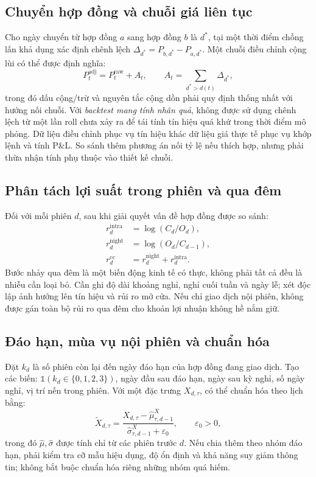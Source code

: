 \documentclass[12pt,a4paper,oneside]{article}
\newcommand{\Ind}{\mathbb{1}}
\begin{document}
\subsection{Chuyển hợp đồng và chuỗi giá liên tục}
Cho ngày chuyển từ hợp đồng $a$ sang hợp đồng $b$ là $d^*$, tại một thời điểm chồng lấn khả dụng xác định chênh lệch $\Delta_{d^*}=P_{b,d^*}-P_{a,d^*}$. Một chuỗi điều chỉnh cộng lùi có thể được định nghĩa:
\begin{equation}
P_t^{\mathrm{adj}}=P_t^{\mathrm{raw}}+A_t,\qquad
A_t=\sum_{d^*>d(t)}\Delta_{d^*},
\end{equation}
trong đó dấu cộng/trừ và nguyên tắc cộng dồn phải quy định thống nhất với hướng nối chuỗi. Với \emph{backtest mang tính nhân quả}, không được sử dụng chênh lệch từ một lần roll chưa xảy ra để tái tính tín hiệu quá khứ trong thời điểm mô phỏng. Dữ liệu điều chỉnh phục vụ tín hiệu khác dữ liệu giá thực tế phục vụ khớp lệnh và tính P\&L. So sánh thêm phương án nối tỷ lệ nếu thích hợp, nhưng phải thừa nhận tính phụ thuộc vào thiết kế chuỗi.

\subsection{Phân tách lợi suất trong phiên và qua đêm}
Đối với mỗi phiên $d$, sau khi giải quyết vấn đề hợp đồng được so sánh:
\begin{align}
r_d^{\mathrm{intra}}&=\log(C_d/O_d),\\
r_d^{\mathrm{night}}&=\log(O_d/C_{d-1}),\\
r_d^{\mathrm{cc}}&=r_d^{\mathrm{night}}+r_d^{\mathrm{intra}}.
\end{align}
Bước nhảy qua đêm là một biến động kinh tế có thực, không phải tất cả đều là nhiễu cần loại bỏ. Cần ghi độ dài khoảng nghỉ, nghỉ cuối tuần và ngày lễ; xét độc lập ảnh hưởng lên tín hiệu và rủi ro mở cửa. Nếu chỉ giao dịch nội phiên, không được gán toàn bộ rủi ro qua đêm cho khoản lợi nhuận không hề nắm giữ.

\subsection{Đáo hạn, mùa vụ nội phiên và chuẩn hóa}
Đặt $k_d$ là số phiên còn lại đến ngày đáo hạn của hợp đồng đang giao dịch. Tạo các biến: $\Ind(k_d\in\{0,1,2,3\})$, ngày đầu sau đáo hạn, ngày sau kỳ nghỉ, số ngày nghỉ, vị trí nến trong phiên. Với một đặc trưng $X_{d,\tau}$, có thể chuẩn hóa theo lịch bằng:
\begin{equation}\label{eq:seasonal}
\widetilde X_{d,\tau}=
\frac{X_{d,\tau}-\widehat\mu_{\tau,d-1}^{X}}
{\widehat\sigma_{\tau,d-1}^{X}+\varepsilon_0},\qquad\varepsilon_0>0,
\end{equation}
trong đó $\widehat\mu,\widehat\sigma$ được tính chỉ từ các phiên trước $d$. Nếu chia thêm theo nhóm đáo hạn, phải kiểm tra cỡ mẫu hiệu dụng, độ ổn định và khả năng suy giảm thông tin; không bắt buộc chuẩn hóa riêng những nhóm quá hiếm.
\end{document}
